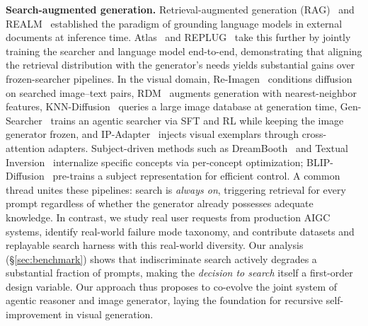 \documentclass{article}
\newcommand{\dataset}{\textsc{SearchGen-20K}}
\newcommand{\searchcorpus}{\textsc{SearchGen-Corpus-1M}}
\begin{document}
\textbf{Search-augmented generation.}
Retrieval-augmented generation (RAG)~\cite{lewis2020rag} and REALM~\cite{guu2020realm} established the paradigm of grounding language models in external documents at inference time.
Atlas~\cite{izacard2023atlas} and REPLUG~\cite{shi2023replug} take this further by jointly training the searcher and language model end-to-end, demonstrating that aligning the retrieval distribution with the generator's needs yields substantial gains over frozen-searcher pipelines.
In the visual domain, Re-Imagen~\cite{chen2023reimagen} conditions diffusion on searched image--text pairs, RDM~\cite{blattmann2022rdm} augments generation with nearest-neighbor features, KNN-Diffusion~\cite{ashual2023knn} queries a large image database at generation time, Gen-Searcher~\cite{feng2026gen} trains an agentic searcher via SFT and RL while keeping the image generator frozen, and IP-Adapter~\cite{ye2023ipadapter} injects visual exemplars through cross-attention adapters.
Subject-driven methods such as DreamBooth~\cite{ruiz2023dreambooth} and Textual Inversion~\cite{gal2022textual} internalize specific concepts via per-concept optimization; BLIP-Diffusion~\cite{li2023blipdiffusion} pre-trains a subject representation for efficient control.
A common thread unites these pipelines: search is \emph{always on}, triggering retrieval for every prompt regardless of whether the generator already possesses adequate knowledge.
In contrast, we study real user requests from production AIGC systems, identify real-world failure mode taxonomy, and contribute datasets and replayable search harness with  this real-world diversity. Our analysis (\S\ref{sec:benchmark})  shows that indiscriminate search actively degrades a substantial fraction of prompts, making the \emph{decision to search} itself a first-order design variable. Our approach thus proposes to co-evolve the joint system of agentic reasoner and image generator, laying the foundation for recursive self-improvement in visual generation. 
\end{document}
